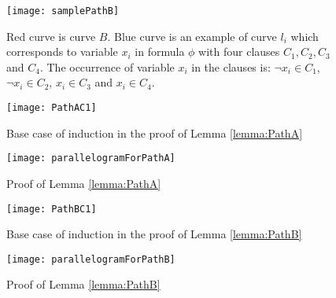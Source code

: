 \documentclass[a4paper,UKenglish]{lipics}
\newcommand{\CS}{{\mathscr S}}
\newcommand{\CQ}{{\mathscr Q}}
\newcommand{\cfev}{{l}} \newcommand{\sq}{{\CS\CQ}}
\begin{document}
\clearpage
\appendix








\begin{figure}[t]
	\centering
	\texttt{[image: samplePathB]}
	\caption{Red curve is curve $B$. Blue curve is an example of curve $\cfev_i$ which corresponds to variable $x_i$ in 
	 formula $\phi$ with four clauses $C_1, C_2, C_3$ and $C_4$. The occurrence of variable $x_i$  in the clauses is: 
$\neg x_i \in C_1$, $ \neg x_i \in C_2$, $x_i \in C_3$ and $x_i \in C_4$.
}
	\label{fig:pathBExample}
\end{figure}



	

\begin{figure}[h]
	\centering
	\texttt{[image: PathAC1]}
	\caption{Base case of induction in the proof of Lemma \ref{lemma:PathA}}
	\label{fig:PathAClause1}
\end{figure}

\begin{figure}
	\centering
	\texttt{[image: parallelogramForPathA]}
	\caption{Proof of Lemma \ref{lemma:PathA}}
	\label{fig:PathA}
\end{figure}
	




\begin{figure}[h]
	\centering
	\texttt{[image: PathBC1]}
	\caption{Base case of induction in the proof of Lemma \ref{lemma:PathB} }
	\label{fig:PathBBaseCase}
\end{figure}



\begin{figure}

	\centering
	\texttt{[image: parallelogramForPathB]}
	\caption{Proof of Lemma \ref{lemma:PathB}}
	\label{fig:PathB}
\end{figure}
\end{document}
